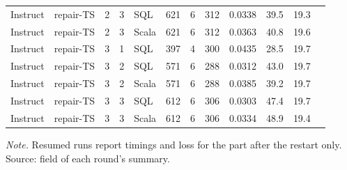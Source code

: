 {\begin{longtable}{@{}llcclrrrrrrc@{}}
Instruct & repair-TS & 2 & 3 & SQL & 621 & 6 & 312 & 0.0338 & 39.5 & 19.3 & \\
Instruct & repair-TS & 2 & 3 & Scala & 621 & 6 & 312 & 0.0363 & 40.8 & 19.6 & \\
Instruct & repair-TS & 3 & 1 & SQL & 397 & 4 & 300 & 0.0435 & 28.5 & 19.7 & \\
Instruct & repair-TS & 3 & 2 & SQL & 571 & 6 & 288 & 0.0312 & 43.0 & 19.7 & \\
Instruct & repair-TS & 3 & 2 & Scala & 571 & 6 & 288 & 0.0385 & 39.2 & 19.7 & \\
Instruct & repair-TS & 3 & 3 & SQL & 612 & 6 & 306 & 0.0303 & 47.4 & 19.7 & \\
Instruct & repair-TS & 3 & 3 & Scala & 612 & 6 & 306 & 0.0334 & 48.9 & 19.4 & \\
\end{longtable}
}
\vspace{-0.6\baselineskip}
{\footnotesize\color{slate}\textit{Note.} Resumed runs report timings and loss for the part after the restart only. Source:  field of each round's summary.\par}
\medskip
